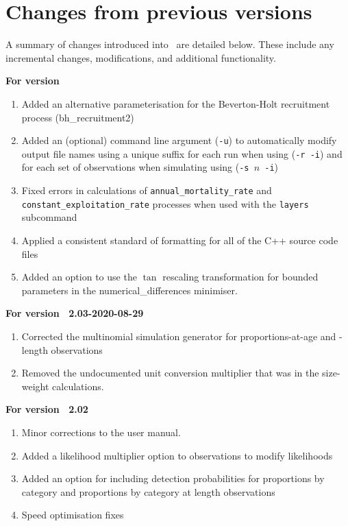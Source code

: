 \section{Changes from previous versions}

A summary of changes introduced into \SPM\ are detailed below. These include any incremental changes, modifications, and additional functionality.

\textbf{For version \SPM\ \VER}
\begin{enumerate}
  \item Added an alternative parameterisation for the Beverton-Holt recruitment process (bh\_recruitment2)
  \item Added an (optional) command line argument (\texttt{-u}) to automatically modify output file names using a unique suffix for each run when using (\texttt{-r -i}) and for each set of observations when simulating using (\texttt{-s \emph{$n$}\ -i})
	\item Fixed errors in calculations of \texttt{annual\_mortality\_rate} and \texttt{constant\_exploitation\_rate} processes when used with the \texttt{layers} subcommand
	\item Applied a consistent standard of formatting for all of the C++ source code files
	\item Added an option to use the $\tan$ rescaling transformation for bounded parameters in the numerical\_differences minimiser.
\end{enumerate}

\textbf{For version \SPM\ 2.03-2020-08-29}
\begin{enumerate}
  \item Corrected the multinomial simulation generator for proportions-at-age and -length observations
	\item Removed the undocumented unit conversion multiplier that was in the size-weight calculations.
\end{enumerate}

\textbf{For version \SPM\ 2.02}

\begin{enumerate}
  \item Minor corrections to the user manual.
	\item Added a likelihood multiplier option to observations to modify likelihoods
	\item Added an option for including detection probabilities for proportions by category and proportions by category at length observations
	\item Speed optimisation fixes
\end{enumerate}

